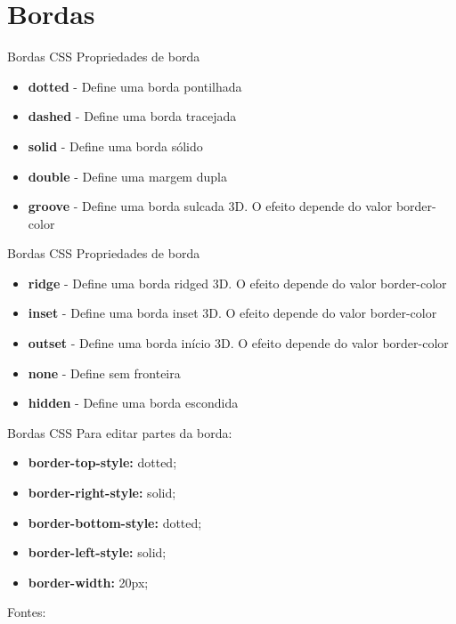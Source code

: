 \documentclass{beamer}
\begin{document}
\section{Bordas}
\begin{frame}{Bordas CSS}
	Propriedades de borda
 \begin{itemize}
  \item \textbf{dotted} - Define uma borda pontilhada
	\item \textbf{dashed} - Define uma borda tracejada
	\item \textbf{solid} - Define uma borda sólido
	\item \textbf{double} - Define uma margem dupla
  \item \textbf{groove} - Define uma borda sulcada 3D. O efeito depende do valor border-color
 \end{itemize}

\end{frame}
\begin{frame}{Bordas CSS}
	Propriedades de borda
 \begin{itemize}
	\item \textbf{ridge} - Define uma borda ridged 3D. O efeito depende do valor border-color
	\item \textbf{inset} - Define uma borda inset 3D. O efeito depende do valor border-color
	\item \textbf{outset} - Define uma borda início 3D. O efeito depende do valor border-color
	\item \textbf{none} - Define sem fronteira
	\item \textbf{hidden} - Define uma borda escondida
 \end{itemize}
\end{frame}
\begin{frame}{Bordas CSS}
Para editar partes da borda:
\begin{itemize}
	\item \textbf{border-top-style:} dotted;
  \item \textbf{border-right-style:} solid;
  \item \textbf{border-bottom-style:} dotted;
  \item \textbf{border-left-style:} solid;
  \item \textbf{border-width:} 20px;
 \end{itemize}
 \tiny Fontes: \cite{wschool2018html, purewal2014learning}
\end{frame}
\end{document}
